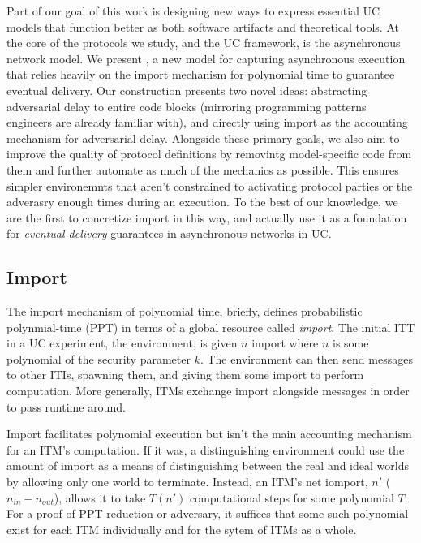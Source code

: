 Part of our goal of this work is designing new ways to express essential UC models that function better as both software artifacts and theoretical tools.
At the core of the protocols we study, and the UC framework, is the asynchronous network model.
We present \fwrapper, a new model for capturing asynchronous execution that relies heavily on the import mechanism for polynomial time to guarantee eventual delivery.
Our construction presents two novel ideas: abstracting adversarial delay to entire code blocks (mirroring programming patterns engineers are already familiar with), and directly using import as the accounting mechanism for adversarial delay.
Alongside these primary goals, we also aim to improve the quality of protocol definitions by removintg model-specific code from them and further automate as much of the mechanics as possible.
This ensures simpler environemnts that aren't constrained to activating protocol parties or the adverasry enough times during an execution.
To the best of our knowledge, we are the first to concretize import in this way, and actually use it as a foundation for \emph{eventual delivery} guarantees in asynchronous networks in UC.

\subsection{Import}
The import mechanism of polynomial time, briefly, defines probabilistic polynmial-time (PPT) in terms of a global resource called \emph{import}.
The initial ITT in a UC experiment, the environment, is given $n$ import where $n$ is some polynomial of the security parameter $k$. 
The environment can then send messages to other ITIs, spawning them, and giving them some import to perform computation.
More generally, ITMs exchange import alongside messages in order to pass runtime around.

Import facilitates polynomial execution but isn't the main accounting mechanism for an ITM's computation.
If it was, a distinguishing environment could use the amount of import as a means of distinguishing between the real and ideal worlds by allowing only one world to terminate.
Instead, an ITM's net iomport, $n'$ ($n_{in} - n_{out}$), allows it to take $T(n')$ computational steps for some polynomial $T$. 
For a proof of PPT reduction or adversary, it suffices that some such polynomial exist for each ITM individually and for the sytem of ITMs as a whole.

